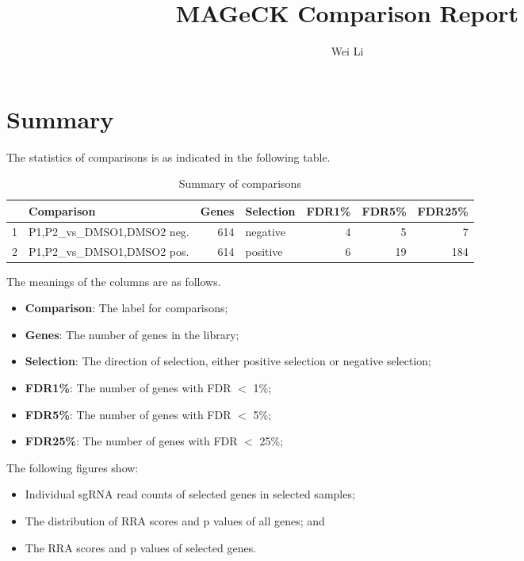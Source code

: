 \documentclass{article}
\begin{document}


\title{MAGeCK Comparison Report}
\author{Wei Li}

\maketitle


\tableofcontents

\section{Summary}


The statistics of comparisons is as indicated in the following table. 

\begin{table}[ht]
\centering
\begin{tabular}{rlrlrrr}
  \hline
 & Comparison & Genes & Selection & FDR1\% & FDR5\% & FDR25\% \\ 
  \hline
1 & P1,P2\_vs\_DMSO1,DMSO2 neg. & 614 & negative & 4 & 5 & 7 \\ 
  2 & P1,P2\_vs\_DMSO1,DMSO2 pos. & 614 & positive & 6 & 19 & 184 \\ 
   \hline
\end{tabular}
\caption{Summary of comparisons} 
\label{tab:one}
\end{table}
The meanings of the columns are as follows.

\begin{itemize}
\item \textbf{Comparison}: The label for comparisons;
\item \textbf{Genes}: The number of genes in the library;
\item \textbf{Selection}: The direction of selection, either positive selection or negative selection;
\item \textbf{FDR1\%}: The number of genes with FDR $<$ 1\%;
\item \textbf{FDR5\%}: The number of genes with FDR $<$ 5\%;
\item \textbf{FDR25\%}: The number of genes with FDR $<$ 25\%;
\end{itemize}

The following figures show:

\begin{itemize}
\item Individual sgRNA read counts of selected genes in selected samples; 
\item The distribution of RRA scores and p values of all genes; and
\item The RRA scores and p values of selected genes.
\end{itemize}
\end{document}
